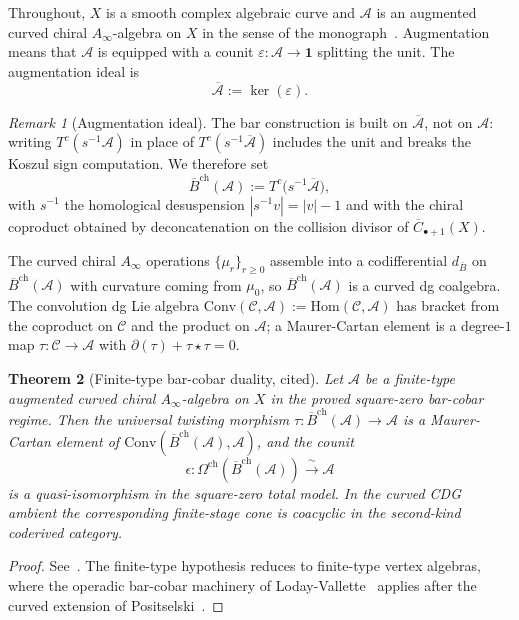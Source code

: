 \documentclass[11pt,reqno]{amsart}
\newtheorem{theorem}{Theorem}[section]
\theoremstyle{definition}
\theoremstyle{remark}
\newtheorem{remark}[theorem]{Remark}
\newcommand{\cA}{\mathcal{A}}
\newcommand{\cC}{\mathcal{C}}
\newcommand{\barB}{\overline{B}}
\newcommand{\Hom}{\mathrm{Hom}}
\newcommand{\Ainf}{A_\infty}
\newcommand{\Conv}{\mathrm{Conv}}
\numberwithin{equation}{section}
\begin{document}
Throughout, $X$ is a smooth complex algebraic curve and
$\cA$ is an augmented curved chiral $\Ainf$-algebra on $X$ in
the sense of the monograph~\cite{LorgatI}. Augmentation means
that $\cA$ is equipped with a counit
$\varepsilon\colon \cA \to \mathbf{1}$ splitting the unit.
The augmentation ideal is
\[
\overline{\cA} := \ker(\varepsilon).
\]

\begin{remark}[Augmentation ideal]
\label{rem:barA}
The bar construction is built on $\overline{\cA}$, not on
$\cA$: writing $T^c(s^{-1}\cA)$ in place of
$T^c(s^{-1}\overline{\cA})$ includes the unit and breaks the
Koszul sign computation. We therefore set
\[
\barB^{\mathrm{ch}}(\cA) := T^c\bigl(s^{-1}\overline{\cA}\bigr),
\]
with $s^{-1}$ the homological desuspension
$|s^{-1}v| = |v| - 1$ and with the chiral coproduct obtained
by deconcatenation on the collision divisor of
$\overline{C}_{\bullet+1}(X)$.
\end{remark}

The curved chiral $\Ainf$ operations $\{\mu_r\}_{r \ge 0}$
assemble into a codifferential $d_{\barB}$ on
$\barB^{\mathrm{ch}}(\cA)$ with curvature coming from $\mu_0$,
so $\barB^{\mathrm{ch}}(\cA)$ is a curved dg coalgebra. The
convolution dg Lie algebra
$\Conv(\cC, \cA) := \Hom(\cC, \cA)$ has bracket from the
coproduct on $\cC$ and the product on $\cA$; a Maurer-Cartan
element is a degree-$1$ map $\tau\colon \cC \to \cA$ with
$\partial(\tau) + \tau \star \tau = 0$.

\begin{theorem}[Finite-type bar-cobar duality, cited]
\label{thm:finite-type-bar-cobar}
Let $\cA$ be a finite-type augmented curved chiral
$\Ainf$-algebra on $X$ in the proved square-zero bar-cobar regime.
Then the universal twisting morphism
$\tau\colon \barB^{\mathrm{ch}}(\cA) \to \cA$ is a
Maurer-Cartan element of
$\Conv(\barB^{\mathrm{ch}}(\cA), \cA)$, and the counit
\[
\epsilon\colon \Omega^{\mathrm{ch}}(\barB^{\mathrm{ch}}(\cA))
\xrightarrow{\ \sim\ }\cA
\]
is a quasi-isomorphism in the square-zero total model. In the
curved CDG ambient the corresponding finite-stage cone is
coacyclic in the second-kind coderived category.
\end{theorem}

\begin{proof}
See~\cite[Thm.~B]{LorgatI}. The finite-type hypothesis
reduces to finite-type vertex algebras, where the operadic
bar-cobar machinery of Loday-Vallette~\cite{LV12} applies
after the curved extension of Positselski~\cite{Positselski11}.
\end{proof}
\end{document}

